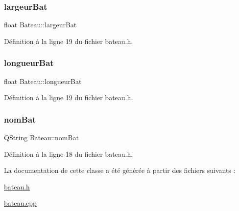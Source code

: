 \subsubsection{\texorpdfstring{largeur\+Bat}{largeurBat}}
{\footnotesize\ttfamily float Bateau\+::largeur\+Bat\hspace{0.3cm}{\ttfamily [private]}}



Définition à la ligne 19 du fichier bateau.\+h.

\mbox{\label{class_bateau_a6c1f8f9f5bb656fae6ce59bcfa6fe8aa}} 
\subsubsection{\texorpdfstring{longueur\+Bat}{longueurBat}}
{\footnotesize\ttfamily float Bateau\+::longueur\+Bat\hspace{0.3cm}{\ttfamily [private]}}



Définition à la ligne 19 du fichier bateau.\+h.

\mbox{\label{class_bateau_a2d01e3edfc60cb9111a5f4f11b2813b3}} 
\subsubsection{\texorpdfstring{nom\+Bat}{nomBat}}
{\footnotesize\ttfamily Q\+String Bateau\+::nom\+Bat\hspace{0.3cm}{\ttfamily [private]}}



Définition à la ligne 18 du fichier bateau.\+h.



La documentation de cette classe a été générée à partir des fichiers suivants \+:\begin{DoxyCompactItemize}
\item 
\hyperlink{bateau_8h}{bateau.\+h}\item 
\hyperlink{bateau_8cpp}{bateau.\+cpp}\end{DoxyCompactItemize}
